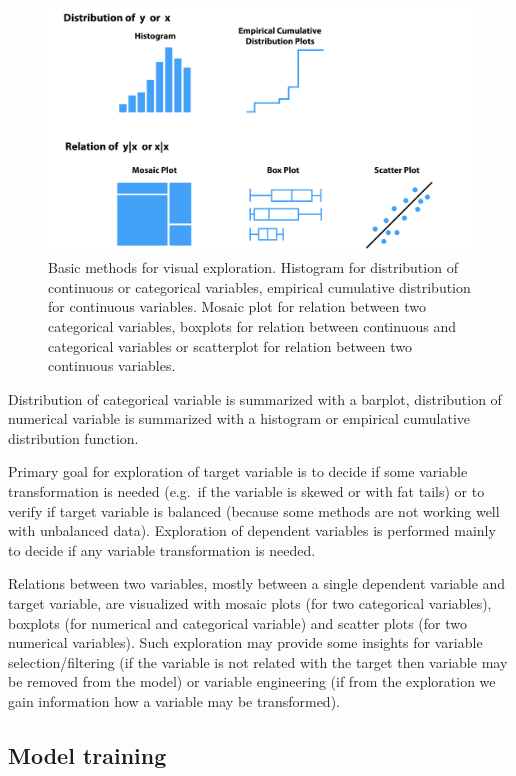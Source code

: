 \documentclass[12pt,]{krantz}
\begin{document}
\begin{figure}

{\centering \includegraphics[width=0.75\linewidth]{figure/UMEPEDA} 

}

\caption{Basic methods for visual exploration. Histogram for distribution of continuous or categorical variables, empirical cumulative distribution for continuous variables. Mosaic plot for relation between two categorical variables, boxplots for relation between continuous and categorical variables or scatterplot for relation between two continuous variables.}\label{fig:UMEPEDA}
\end{figure}

Distribution of categorical variable is summarized with a barplot, distribution of numerical variable is summarized with a histogram or empirical cumulative distribution function.

Primary goal for exploration of target variable is to decide if some variable transformation is needed (e.g.~if the variable is skewed or with fat tails) or to verify if target variable is balanced (because some methods are not working well with unbalanced data). Exploration of dependent variables is performed mainly to decide if any variable transformation is needed.

Relations between two variables, mostly between a single dependent variable and target variable, are visualized with mosaic plots (for two categorical variables), boxplots (for numerical and categorical variable) and scatter plots (for two numerical variables). Such exploration may provide some insights for variable selection/filtering (if the variable is not related with the target then variable may be removed from the model) or variable engineering (if from the exploration we gain information how a variable may be transformed).

\hypertarget{model-training}{%
\subsection{Model training}\label{model-training}}
\end{document}
